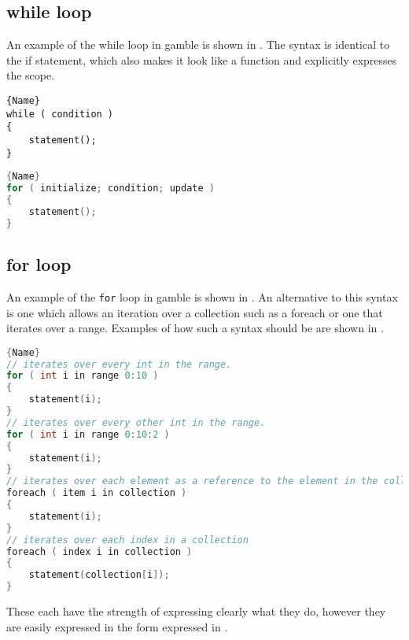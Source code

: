 \subsection{while loop}
An example of the while loop in \gls{gamble} is shown in . 
The syntax is identical to the if statement, which also makes it look like a function and explicitly expresses the scope.

\vspace{10pt}
\noindent\begin{minipage}{.40\textwidth}
\begin{lstlisting}[caption=A while loop in \gls{gamble}.,frame=tlrb, label=whilelst, numbers=none]{Name}
while ( condition )
{
    statement();
}
\end{lstlisting}
\end{minipage}\hfill
\begin{minipage}{.50\textwidth}
\begin{lstlisting}[caption=A for loop in \gls{gamble}.,frame=tlrb, label=forlst, numbers=none, language=C]{Name}
for ( initialize; condition; update )
{
    statement();
}
\end{lstlisting}
\end{minipage}

\subsection{for loop}
An example of the \texttt{for} loop in \gls{gamble} is shown in .
An alternative to this syntax is one which allows an iteration over a collection such as a foreach or one that iterates over a range.
Examples of how such a syntax should be are shown in .

\begin{lstlisting}[caption=Alternative syntaxes for the for loop.,frame=tlrb, label=forextlst, numbers=none, language=C]{Name}
// iterates over every int in the range.
for ( int i in range 0:10 )
{
    statement(i);
}
// iterates over every other int in the range.
for ( int i in range 0:10:2 )
{
    statement(i);
}
// iterates over each element as a reference to the element in the collection
foreach ( item i in collection )
{
    statement(i);
}
// iterates over each index in a collection
foreach ( index i in collection )
{
    statement(collection[i]);
}
\end{lstlisting}

These each have the strength of expressing clearly what they do, however they are easily expressed in the form expressed in .
